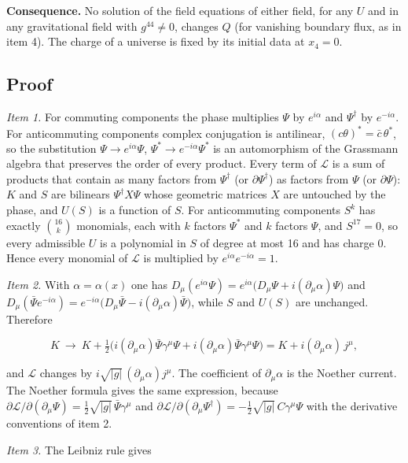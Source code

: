 \documentclass[11pt]{article}
\begin{document}
\textbf{Consequence.} No solution of the field equations of either field, for any $U$ and in any gravitational field with $g^{44}\ne0$, changes $Q$ (for vanishing boundary flux, as in item 4). The charge of a universe is fixed by its initial data at $x_4=0$.

\subsection{Proof}

\emph{Item 1.} For commuting components the phase multiplies $\Psi$ by $e^{i\alpha}$ and $\Psi^\dagger$ by $e^{-i\alpha}$. For anticommuting components complex conjugation is antilinear, $(c\theta)^\ast=\bar c\,\theta^\ast$, so the substitution $\Psi\to e^{i\alpha}\Psi$, $\Psi^\ast\to e^{-i\alpha}\Psi^\ast$ is an automorphism of the Grassmann algebra that preserves the order of every product. Every term of $\mathcal L$ is a sum of products that contain as many factors from $\Psi^\dagger$ (or $\partial\Psi^\dagger$) as factors from $\Psi$ (or $\partial\Psi$): $K$ and $S$ are bilinears $\Psi^\dagger X\Psi$ whose geometric matrices $X$ are untouched by the phase, and $U(S)$ is a function of $S$. For anticommuting components $S^k$ has exactly $\binom{16}{k}$ monomials, each with $k$ factors $\Psi^\ast$ and $k$ factors $\Psi$, and $S^{17}=0$, so every admissible $U$ is a polynomial in $S$ of degree at most 16 and has charge 0. Hence every monomial of $\mathcal L$ is multiplied by $e^{i\alpha}e^{-i\alpha}=1$.

\emph{Item 2.} With $\alpha=\alpha(x)$ one has $D_\mu(e^{i\alpha}\Psi)=e^{i\alpha}\bigl(D_\mu\Psi+i(\partial_\mu\alpha)\Psi\bigr)$ and $D_\mu(\bar\Psi e^{-i\alpha})=e^{-i\alpha}\bigl(D_\mu\bar\Psi-i(\partial_\mu\alpha)\bar\Psi\bigr)$, while $S$ and $U(S)$ are unchanged. Therefore

\[
K\ \to\ K+\tfrac12\bigl(i(\partial_\mu\alpha)\bar\Psi\gamma^\mu\Psi+i(\partial_\mu\alpha)\bar\Psi\gamma^\mu\Psi\bigr)=K+i(\partial_\mu\alpha)\,j^\mu ,
\]

and $\mathcal L$ changes by $i\sqrt{|g|}\,(\partial_\mu\alpha)j^\mu$. The coefficient of $\partial_\mu\alpha$ is the Noether current. The Noether formula gives the same expression, because $\partial\mathcal L/\partial(\partial_\mu\Psi)=\tfrac12\sqrt{|g|}\,\bar\Psi\gamma^\mu$ and $\partial\mathcal L/\partial(\partial_\mu\Psi^\dagger)=-\tfrac12\sqrt{|g|}\,C\gamma^\mu\Psi$ with the derivative conventions of item 2.

\emph{Item 3.} The Leibniz rule gives
\end{document}
